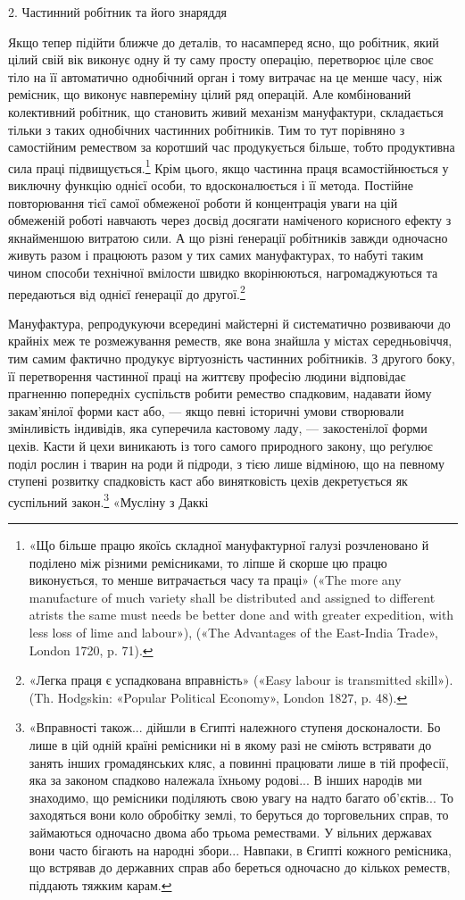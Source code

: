 2. Частинний робітник та його знаряддя

Якщо тепер підійти ближче до деталів, то насамперед ясно,
що робітник, який цілий свій вік виконує одну й ту саму просту
операцію, перетворює ціле своє тіло на її автоматично однобічний
орган і тому витрачає на це менше часу, ніж ремісник, що
виконує навпереміну цілий ряд операцій. Але комбінований
колективний робітник, що становить живий механізм мануфактури,
складається тільки з таких однобічних частинних робітників.
Тим то тут порівняно з самостійним ремеством за коротший
час продукується більше, тобто продуктивна сила праці підвищується.\footnote{
«Що більше працю якоїсь складної мануфактурної галузі розчленовано
й поділено між різними ремісниками, то ліпше й скорше цю працю виконується,
то менше витрачається часу та праці» («The more any manufacture
of much variety shall be distributed and assigned to different atrists
the same must needs be better done and with greater expedition, with less
loss of lime and labour»), («The Advantages of the East-India Trade»,
London 1720, p. 71).
}
Крім цього, якщо частинна праця всамостійнюється
у виключну функцію однієї особи, то вдосконалюється і її метода.
Постійне повторювання тієї самої обмеженої роботи й концентрація
уваги на цій обмеженій роботі навчають через досвід досягати
наміченого корисного ефекту з якнайменшою витратою сили.
А що різні ґенерації робітників завжди одночасно живуть разом
і працюють разом у тих самих мануфактурах, то набуті таким
чином способи технічної вмілости швидко вкорінюються, нагромаджуються
та передаються від однієї ґенерації до другої.\footnote{
«Легка праця є успадкована вправність» («Easy labour is transmitted
skill»). (Th. Hodgskin: «Popular Political Economy», London 1827, p. 48).
}

Мануфактура, репродукуючи всередині майстерні й систематично
розвиваючи до крайніх меж те розмежування реместв,
яке вона знайшла у містах середньовіччя, тим самим фактично
продукує віртуозність частинних робітників. З другого боку, її
перетворення частинної праці на життєву професію людини
відповідає прагненню попередніх суспільств робити ремество спадковим,
надавати йому закам’янілої форми каст або, — якщо
певні історичні умови створювали змінливість індивідів, яка
суперечила кастовому ладу, — закостенілої форми цехів. Касти
й цехи виникають із того самого природного закону, що реґулює
поділ рослин і тварин на роди й підроди, з тією лише відміною,
що на певному ступені розвитку спадковість каст або винятковість
цехів декретується як суспільний закон.\footnote{
«Вправності також... дійшли в Єгипті належного ступеня досконалости.
Бо лише в цій одній країні ремісники ні в якому разі не сміють
встрявати до занять інших громадянських кляс, а повинні працювати
лише в тій професії, яка за законом спадково належала їхньому родові...
В інших народів ми знаходимо, що ремісники поділяють свою увагу на
надто багато об'єктів... То заходяться вони коло обробітку землі, то беруться
до торговельних справ, то займаються одночасно двома або трьома
ремествами. У вільних державах вони часто бігають на народні збори...
Навпаки, в Єгипті кожного ремісника, що встрявав до державних справ
або береться одночасно до кількох реместв, піддають тяжким карам.
} «Мусліну з Даккі